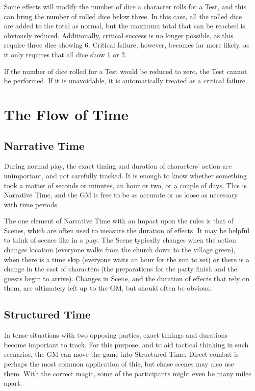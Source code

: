 Some effects will modify the number of dice a character rolls for a Test, and this can bring the number of rolled dice below three.
In this case, all the rolled dice are added to the total as normal, but the maximum total that can be reached is obviously reduced.
Additionally, critical success is no longer possible, as this require three dice showing 6.
Critical failure, however, becomes far more likely, as it only requires that all dice show 1 or 2.

If the number of dice rolled for a Test would be reduced to zero, the Test cannot be performed.
If it is unavoidable, it is automatically treated as a critical failure.

\section{The Flow of Time}

\subsection{Narrative Time}

During normal play, the exact timing and duration of characters' action are unimportant, and not carefully tracked.
It is enough to know whether something took a matter of seconds or minutes, an hour or two, or a couple of days.
This is Narrative Time, and the GM is free to be as accurate or as loose as necessary with time periods.

The one element of Narrative Time with an impact upon the rules is that of Scenes, which are often used to measure the duration of effects.
It may be helpful to think of scenes like in a play.
The Scene typically changes when the action changes location (everyone walks from the church down to the village green), when there is a time skip (everyone waits an hour for the sun to set) or there is a change in the cast of characters (the preparations for the party finish and the guests begin to arrive).
Changes in Scene, and the duration of effects that rely on them, are ultimately left up to the GM, but should often be obvious.

\subsection{Structured Time}

In tense situations with two opposing parties, exact timings and durations become important to track.
For this purpose, and to aid tactical thinking in such scenarios, the GM can move the game into Structured Time.
Direct combat is perhaps the most common application of this, but chase scenes may also use them.
With the correct magic, some of the participants might even be many miles apart.

